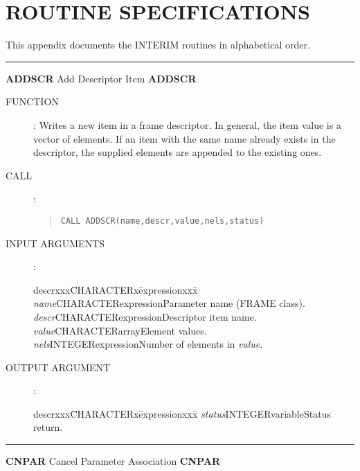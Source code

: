 \section {ROUTINE SPECIFICATIONS}
This appendix documents the INTERIM routines in alphabetical order.\\
\vspace{5mm}
\rule{\textwidth}{0.3mm}
{\Large {\bf ADDSCR} \hfill Add Descriptor Item \hfill {\bf ADDSCR}}
\begin{description}
\item [FUNCTION]:
Writes a new item in a frame descriptor.
In general, the item value is a vector of elements.
If  an item with the same name already exists in the descriptor, the supplied
elements are appended to the existing ones.
\item [CALL]:
\begin{quote}
{\tt CALL ADDSCR(name,descr,value,nels,status)}
\end{quote}
\item [INPUT ARGUMENTS]:
\begin{tabbing}
descrxxx\=CHARACTERx\=expressionxxx\=\kill
{\em name}\>CHARACTER\>expression\>Parameter name (FRAME class).\\
{\em descr}\>CHARACTER\>expression\>Descriptor item name.\\
{\em value}\>CHARACTER\>array\>Element values.\\
{\em nels}\>INTEGER\>expression\>Number of elements in {\em value}.
\end{tabbing}
\item [OUTPUT ARGUMENT]:
\begin{tabbing}
descrxxx\=CHARACTERx\=expressionxxx\=\kill
{\em status}\>INTEGER\>variable\>Status return.
\end{tabbing}
\end{description}
\rule{\textwidth}{0.3mm}
{\Large {\bf CNPAR} \hfill Cancel Parameter Association \hfill {\bf CNPAR}}
